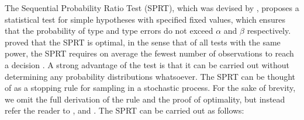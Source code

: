 The Sequential Probability Ratio Test (SPRT), which was devised by \citeauthor{Wald1945SequentialHypotheses}, proposes a statistical test for simple hypotheses with specified fixed values, which ensures that the probability of type  and type  errors do not exceed $\alpha$ and $\beta$ respectively. \citeauthor{Wald1948OptimumTest} proved that the SPRT is optimal, in the sense that of all tests with the same power, the SPRT requires on average the fewest number of observations to reach a decision \cite{Wald1948OptimumTest}. A strong advantage of the test is that it can be carried out without determining any probability distributions whatsoever. The SPRT can be thought of as a stopping rule for sampling in a stochastic process. For the sake of brevity, we omit the full derivation of the rule and the proof of optimality, but instead refer the reader to \cite{Wald1945SequentialHypotheses}, \cite{Wald1950BayesProblems} and \cite{Wald1948OptimumTest}. The SPRT can be carried out as follows:




